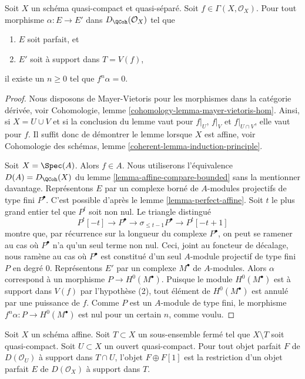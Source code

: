 \begin{lemma}
\label{lemma-perfect-into-support-on-T}
Soit $X$ un schéma quasi-compact et quasi-séparé.
Soit $f \in \Gamma(X, \mathcal{O}_X)$.
Pour tout morphisme $\alpha : E \to E'$ dans
$D_\QCoh(\mathcal{O}_X)$ tel que
\begin{enumerate}
\item $E$ soit parfait, et
\item $E'$ soit à support dans $T = V(f)$,
\end{enumerate}
il existe un $n \geq 0$ tel que $f^n \alpha  = 0$.
\end{lemma}

\begin{proof}
Nous disposons de Mayer-Vietoris pour les morphismes dans la catégorie dérivée, voir
Cohomologie, lemme \ref{cohomology-lemma-mayer-vietoris-hom}.
Ainsi, si $X = U \cup V$ et si la conclusion du lemme vaut
pour $f|_U$, $f|_V$ et $f|_{U \cap V}$, elle vaut pour $f$.
Il suffit donc de démontrer le lemme lorsque $X$ est affine, voir
Cohomologie des schémas, lemme \ref{coherent-lemma-induction-principle}.

\medskip\noindent
Soit $X = \Spec(A)$. Alors $f \in A$. Nous utiliserons
l'équivalence $D(A) = D_\QCoh(X)$ du
lemme \ref{lemma-affine-compare-bounded}
sans la mentionner davantage.
Représentons $E$ par un complexe borné de $A$-modules projectifs de type fini
$P^\bullet$. C'est possible d'après le lemme \ref{lemma-perfect-affine}.
Soit $t$ le plus grand entier tel que $P^t$ soit non nul.
Le triangle distingué
$$
P^t[-t] \to P^\bullet \to \sigma_{\leq t - 1}P^\bullet \to P^t[-t + 1]
$$
montre que, par récurrence sur la longueur du complexe $P^\bullet$,
on peut se ramener au cas où $P^\bullet$ n'a qu'un seul terme non nul.
Ceci, joint au foncteur de décalage, nous ramène au cas où $P^\bullet$
est constitué d'un seul $A$-module projectif de type fini $P$ en degré $0$.
Représentons $E'$ par un complexe $M^\bullet$ de $A$-modules.
Alors $\alpha$ correspond à un morphisme $P \to H^0(M^\bullet)$.
Puisque le module $H^0(M^\bullet)$ est à support dans $V(f)$ par l'hypothèse (2),
tout élément de $H^0(M^\bullet)$ est annulé par une puissance
de $f$. Comme $P$ est un $A$-module de type fini, le morphisme
$f^n\alpha : P \to H^0(M^\bullet)$ est nul pour un certain $n$, comme voulu.
\end{proof}

\begin{lemma}
\label{lemma-lift-perfect-complex-plus-shift-support}
Soit $X$ un schéma affine. Soit $T \subset X$ un sous-ensemble fermé
tel que $X \setminus T$ soit quasi-compact. Soit $U \subset X$ un
ouvert quasi-compact. Pour tout objet parfait $F$ de $D(\mathcal{O}_U)$
à support dans $T \cap U$, l'objet $F \oplus F[1]$ est la restriction
d'un objet parfait $E$ de $D(\mathcal{O}_X)$ à support dans $T$.
\end{lemma}

